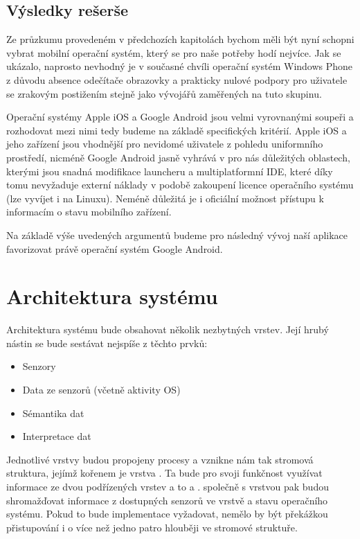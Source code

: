 \documentclass[thesis=M,czech]{FITthesis}[2012/06/26]
\begin{document}
\subsection{Výsledky rešerše}
Ze průzkumu provedeném v předchozích kapitolách bychom měli být nyní schopni vybrat mobilní operační systém, který se pro naše potřeby hodí nejvíce. Jak se ukázalo, naprosto nevhodný je v současné chvíli operační systém Windows Phone z důvodu absence odečítače obrazovky a prakticky nulové podpory pro uživatele se zrakovým postižením stejně jako vývojářů zaměřených na tuto skupinu.

Operační systémy Apple iOS a Google Android jsou velmi vyrovnanými soupeři a rozhodovat mezi nimi tedy budeme na základě specifických kritérií. Apple iOS a jeho zařízení jsou vhodnější pro nevidomé uživatele z pohledu uniformního prostředí, nicméně Google Android jasně vyhrává v pro nás důležitých oblastech, kterými jsou snadná modifikace launcheru a multiplatformní IDE, které díky tomu nevyžaduje externí náklady v podobě zakoupení licence operačního systému (lze vyvíjet i na Linuxu). Neméně důležitá je i oficiální možnost přístupu k informacím o stavu mobilního zařízení.

Na základě výše uvedených argumentů budeme pro následný vývoj naší aplikace favorizovat právě operační systém Google Android.

\section{Architektura systému}\label{architecture}
Architektura systému bude obsahovat několik nezbytných vrstev. Její hrubý nástin se bude sestávat nejspíše z těchto prvků:

\begin{itemize}
\item    Senzory
\item    Data ze senzorů (včetně aktivity OS)
\item    Sémantika dat
\item    Interpretace dat
\end{itemize}

Jednotlivé vrstvy budou propojeny procesy a vznikne nám tak stromová struktura, jejímž kořenem je vrstva . Ta bude pro svoji funkčnost využívat informace ze dvou podřízených vrstev a to  a .  společně s vrstvou  pak budou shromažďovat informace z dostupných senzorů ve vrstvě  a stavu operačního systému. Pokud to bude implementace vyžadovat, nemělo by být překážkou přistupování i o více než jedno patro hlouběji ve stromové struktuře.
\end{document}
